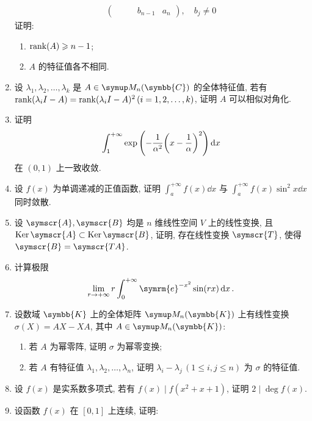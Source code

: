 \documentclass{ctexart}
\let\ge\geqslant
\let\le\leqslant
\newcommand{\limit}[2]{\lim_{#1 \to #2}}
\newcommand{\me}{\symrm{e}}
\newcommand{\K}{\ensuremath{\symbb{K}}}
\newcommand{\C}{\ensuremath{\symbb{C}}}
\DeclareMathOperator{\Ker}{Ker}
\begin{document}
\begin{enumerate}[resume=exer]
\begin{align*}
\begin{pmatrix}
                & & & b_{n-1} & a_{n}
            \end{pmatrix},\quad b_{j} \ne 0
        \end{align*}
        证明: 
        \begin{enumerate}
            \item $ \rank(A) \ge n-1 $;
            \item $ A $ 的特征值各不相同. 
        \end{enumerate}
        \item 设 $ \lambda_{1}, \lambda_{2}, \dots, \lambda_{k} $ 是 $ A\in \MM[\C] $ 的全体特征值, 若有 $ \rank(\lambda_{i}I - A) = \rank(\lambda_{i}I - A)^{2}\,(i = 1, 2, \dots, k) $, 证明 $ A $ 可以相似对角化.
        \item 证明
        \begin{align*}
            \int_{1}^{+\infty}\exp\qty(-\frac{1}{\alpha^{2}}\qty(x-\frac{1}{\alpha})^{2}) \dd{x}
        \end{align*}
        在 $ (0, 1) $ 上一致收敛.
        \item 设 $ f(x) $ 为单调递减的正值函数, 证明 $ \int_{a}^{+\infty} f(x) \dd{x} $ 与 $ \int_{a}^{+\infty} f(x)\sin^{2}{x} \dd{x} $ 同时敛散.
        \item 设 $ \symscr{A}, \symscr{B} $ 均是 $ n $ 维线性空间 $ V $ 上的线性变换, 且 $ \Ker \symscr{A} \subset \Ker \symscr{B} $, 证明, 存在线性变换 $ \symscr{T} $, 使得 $ \symscr{B} = \symscr{TA} $.
        \item 计算极限
        \begin{align*}
            \limit{r}{+\infty} r\int_{0}^{+\infty} \me^{-x^{2}}\sin(rx) \dd{x}.
        \end{align*}
        \item 设数域 $ \K $ 上的全体矩阵 $ \MM[\K] $ 上有线性变换 $ \sigma(X) = AX - XA $, 其中 $ A \in \MM[\K] $:
        \begin{enumerate}
            \item 若 $ A $ 为幂零阵, 证明 $ \sigma $ 为幂零变换;
            \item 若 $ A $ 有特征值 $ \lambda_{1}, \lambda_{2}, \dots, \lambda_{n} $, 证明 $ \lambda_{i} - \lambda_{j}\,(1\le i, j\le n) $ 为 $ \sigma $ 的特征值.
        \end{enumerate}
        \item 设 $ f(x) $ 是实系数多项式, 若有 $ f(x) \mid f(x^2 + x + 1) $, 证明 $ 2 \mid \deg f(x) $.
        \item 设函数 $ f(x) $ 在 $ [0, 1] $ 上连续, 证明:
        \begin{align*}

\end{align*}
\end{enumerate}
\end{document}
